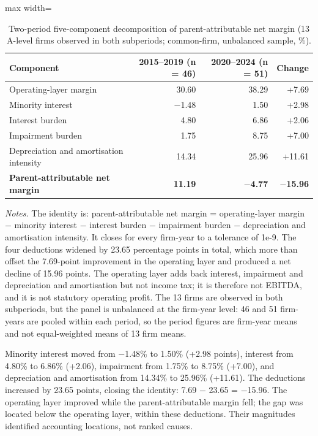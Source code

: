 \documentclass[review,3p,times]{elsarticle}
\begin{document}
\begin{table}[!htbp]
\centering
\caption{Two-period five-component decomposition of parent-attributable net margin (13 A-level firms observed in both subperiods; common-firm, unbalanced sample, \%).}\label{tab:2}
\begin{minipage}{\textwidth}
\centering
\footnotesize
\begin{adjustbox}{max width=\textwidth}
\begin{tabular}{@{}lrrr@{}}
\toprule
Component & 2015--2019 (n = 46) & 2020--2024 (n = 51) & Change \\
\midrule
Operating-layer margin & 30.60 & 38.29 & +7.69 \\
Minority interest & \ensuremath{-}1.48 & 1.50 & +2.98 \\
Interest burden & 4.80 & 6.86 & +2.06 \\
Impairment burden & 1.75 & 8.75 & +7.00 \\
Depreciation and amortisation intensity & 14.34 & 25.96 & +11.61 \\
\textbf{Parent-attributable net margin} & \textbf{11.19} & \textbf{\ensuremath{-}4.77} & \textbf{\ensuremath{-}15.96} \\
\bottomrule
\end{tabular}
\end{adjustbox}
\par\medskip
\raggedright
\noindent\textit{Notes.} The identity is: parent-attributable net margin = operating-layer margin \ensuremath{-} minority interest \ensuremath{-} interest burden \ensuremath{-} impairment burden \ensuremath{-} depreciation and amortisation intensity. It closes for every firm-year to a tolerance of 1e-9. The four deductions widened by 23.65 percentage points in total, which more than offset the 7.69-point improvement in the operating layer and produced a net decline of 15.96 points. The operating layer adds back interest, impairment and depreciation and amortisation but not income tax; it is therefore not EBITDA, and it is not statutory operating profit. The 13 firms are observed in both subperiods, but the panel is unbalanced at the firm-year level: 46 and 51 firm-years are pooled within each period, so the period figures are firm-year means and not equal-weighted means of 13 firm means.
\end{minipage}
\end{table}

Minority interest moved from \ensuremath{-}1.48\% to 1.50\% (+2.98 points), interest from 4.80\% to 6.86\% (+2.06), impairment from 1.75\% to 8.75\% (+7.00), and depreciation and amortisation from 14.34\% to 25.96\% (+11.61). The deductions increased by 23.65 points, closing the identity: 7.69 \ensuremath{-} 23.65 = \ensuremath{-}15.96. The operating layer improved while the parent-attributable margin fell; the gap was located below the operating layer, within these deductions. Their magnitudes identified accounting locations, not ranked causes.
\end{document}
